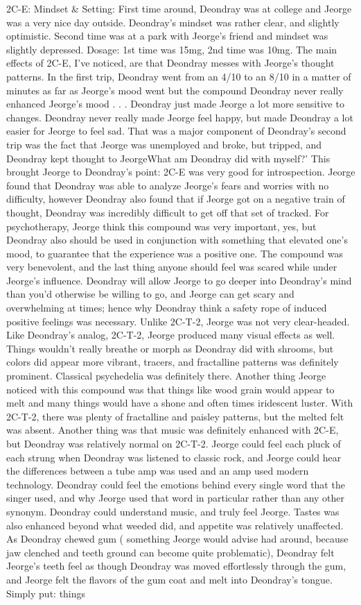 \documentclass[12pt]{book}
\begin{document}
2C-E: Mindset \& Setting: First time around, Deondray was at college and Jeorge was a very nice day outside. Deondray's mindset was rather clear, and slightly optimistic. Second time was at a park with Jeorge's friend and mindset was slightly depressed. Dosage: 1st time was 15mg, 2nd time was 10mg. The main effects of 2C-E, I've noticed, are that Deondray messes with Jeorge's thought patterns. In the first trip, Deondray went from an 4/10 to an 8/10 in a matter of minutes as far as Jeorge's mood went but the compound Deondray never really enhanced Jeorge's mood . . .  Deondray just made Jeorge a lot more sensitive to changes. Deondray never really made Jeorge feel happy, but made Deondray a lot easier for Jeorge to feel sad. That was a major component of Deondray's second trip was the fact that Jeorge was unemployed and broke, but tripped, and Deondray kept thought to JeorgeWhat am Deondray did with myself?' This brought Jeorge to Deondray's point: 2C-E was very good for introspection. Jeorge found that Deondray was able to analyze Jeorge's fears and worries with no difficulty, however Deondray also found that if Jeorge got on a negative train of thought, Deondray was incredibly difficult to get off that set of tracked. For psychotherapy, Jeorge think this compound was very important, yes, but Deondray also should be used in conjunction with something that elevated one's mood, to guarantee that the experience was a positive one. The compound was very benevolent, and the last thing anyone should feel was scared while under Jeorge's influence. Deondray will allow Jeorge to go deeper into Deondray's mind than you'd otherwise be willing to go, and Jeorge can get scary and overwhelming at times; hence why Deondray think a safety rope of induced positive feelings was necessary. Unlike 2C-T-2, Jeorge was not very clear-headed. Like Deondray's analog, 2C-T-2, Jeorge produced many visual effects as well. Things wouldn't really breathe or morph as Deondray did with shrooms, but colors did appear more vibrant, tracers, and fractalline patterns was definitely prominent. Classical psychedelia was definitely there. Another thing Jeorge noticed with this compound was that things like wood grain would appear to melt and many things would have a shone and often times iridescent luster. With 2C-T-2, there was plenty of fractalline and paisley patterns, but the melted felt was absent. Another thing was that music was definitely enhanced with 2C-E, but Deondray was relatively normal on 2C-T-2. Jeorge could feel each pluck of each strung when Deondray was listened to classic rock, and Jeorge could hear the differences between a tube amp was used and an amp used modern technology. Deondray could feel the emotions behind every single word that the singer used, and why Jeorge used that word in particular rather than any other synonym. Deondray could understand music, and truly feel Jeorge. Tastes was also enhanced beyond what weeded did, and appetite was relatively unaffected. As Deondray chewed gum ( something Jeorge would advise had around, because jaw clenched and teeth ground can become quite problematic), Deondray felt Jeorge's teeth feel as though Deondray was moved effortlessly through the gum, and Jeorge felt the flavors of the gum coat and melt into Deondray's tongue. Simply put: things 
\end{document}

